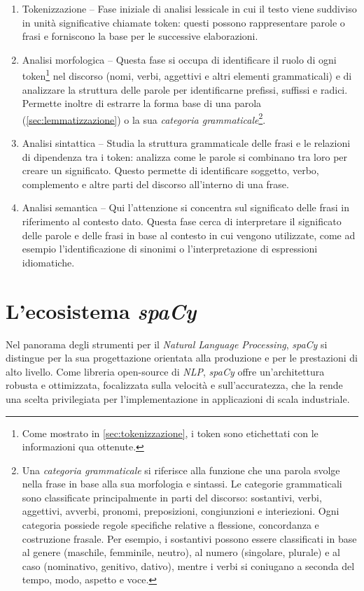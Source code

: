 \documentclass[12pt]{report}
\newcommand{\spacy}{\textsl{spaCy}\xspace}
\newcommand{\nlp}{\textsl{NLP}\xspace}
\begin{document}
\begin{enumerate}
\item \textsf{Tokenizzazione} -- Fase iniziale di analisi lessicale in cui il testo viene suddiviso in unità significative chiamate token: questi possono rappresentare parole o frasi e forniscono la base per le successive elaborazioni.
\item \textsf{Analisi morfologica} -- Questa fase si occupa di identificare il ruolo di ogni token\footnote{Come mostrato in \cref{sec:tokenizzazione}, i token sono etichettati con le informazioni qua ottenute.} nel discorso (nomi, verbi, aggettivi e altri elementi grammaticali) e di analizzare la struttura delle parole per identificarne prefissi, suffissi e radici. Permette inoltre di estrarre la forma base di una parola (\cref{sec:lemmatizzazione}) o la sua \textit{categoria grammaticale}\footnote{Una \textit{categoria grammaticale} si riferisce alla funzione che una parola svolge nella frase in base alla sua morfologia e sintassi. Le categorie grammaticali sono classificate principalmente in parti del discorso: sostantivi, verbi, aggettivi, avverbi, pronomi, preposizioni, congiunzioni e interiezioni. Ogni categoria possiede regole specifiche relative a flessione, concordanza e costruzione frasale. Per esempio, i sostantivi possono essere classificati in base al genere (maschile, femminile, neutro), al numero (singolare, plurale) e al caso (nominativo, genitivo, dativo), mentre i verbi si coniugano a seconda del tempo, modo, aspetto e voce.}.
\item \textsf{Analisi sintattica} -- Studia la struttura grammaticale delle frasi e le relazioni di dipendenza tra i token: analizza come le parole si combinano tra loro per creare un significato. Questo permette di identificare soggetto, verbo, complemento e altre parti del discorso all'interno di una frase.
\item \textsf{Analisi semantica} -- Qui l'attenzione si concentra sul significato delle frasi in riferimento al contesto dato. Questa fase cerca di interpretare il significato delle parole e delle frasi in base al contesto in cui vengono utilizzate, come ad esempio l'identificazione di sinonimi o l'interpretazione di espressioni idiomatiche.
\end{enumerate}


\section{L'ecosistema \spacy}
Nel panorama degli strumenti per il \textit{Natural Language Processing}, \spacy si distingue per la sua progettazione orientata alla produzione e per le prestazioni di alto livello. Come libreria open-source di \nlp, \spacy offre un'architettura robusta e ottimizzata, focalizzata sulla velocità e sull'accuratezza, che la rende una scelta privilegiata per l'implementazione in applicazioni di scala industriale.
\end{document}
